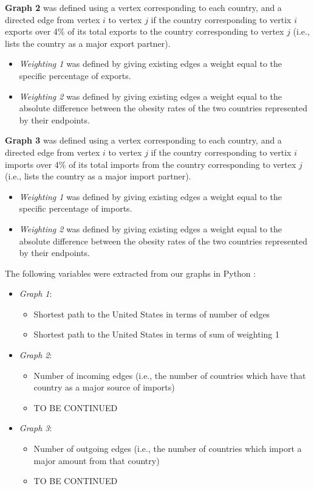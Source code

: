 \documentclass[oneside,12pt]{report}
\begin{document}
\textbf{Graph 2} was defined using a vertex corresponding to each country, and a directed edge from vertex $i$ to vertex $j$ if the country corresponding to vertix $i$ exports over 4\% of its total exports to the country corresponding to vertex $j$ (i.e., lists the country as a major export partner).
\begin{itemize}
\item \emph{Weighting 1} was defined by giving existing edges a weight equal to the specific percentage of exports.
\item \emph{Weighting 2} was defined by giving existing edges a weight equal to the absolute difference between the obesity rates of the two countries represented by their endpoints.
\end{itemize}

\textbf{Graph 3} was defined using a vertex corresponding to each country, and a directed edge from vertex $i$ to vertex $j$ if the country corresponding to vertix $i$ imports over 4\% of its total imports from the country corresponding to vertex $j$ (i.e., lists the country as a major import partner).
\begin{itemize}
\item \emph{Weighting 1} was defined by giving existing edges a weight equal to the specific percentage of imports.
\item \emph{Weighting 2} was defined by giving existing edges a weight equal to the absolute difference between the obesity rates of the two countries represented by their endpoints.
\end{itemize}

\noindent
The following variables were extracted from our graphs in Python :
\begin{itemize}
\item \emph{Graph 1}:
	\begin{itemize}
	\item Shortest path to the United States in terms of number of edges
	\item Shortest path to the United States in terms of sum of weighting 1
	\end{itemize}
\item \emph{Graph 2}:
	\begin{itemize}
	\item Number of incoming edges (i.e., the number of countries which have that country as a major source of imports)
	\item TO BE CONTINUED
	\end{itemize}
\item \emph{Graph 3}:
	\begin{itemize}
	\item Number of outgoing edges (i.e., the number of countries which import a major amount from that country)
	\item TO BE CONTINUED
	\end{itemize}
\end{itemize}
\end{document}
